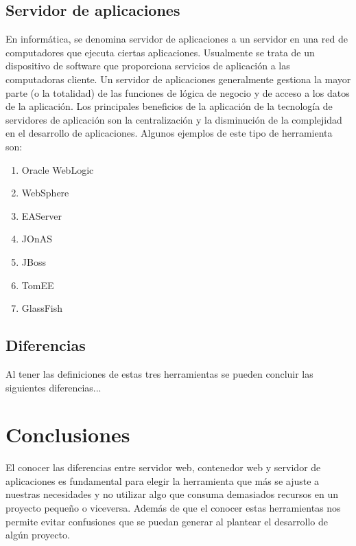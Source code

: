 \documentclass[a4paper,12pt]{article}
\begin{document}
\subsection{Servidor de aplicaciones}
En informática, se denomina servidor de aplicaciones a un servidor en una red de computadores que ejecuta ciertas aplicaciones. Usualmente se trata de un dispositivo de software que proporciona servicios de aplicación a las computadoras cliente. Un servidor de aplicaciones generalmente gestiona la mayor parte (o la totalidad) de las funciones de lógica de negocio y de acceso a los datos de la aplicación. Los principales beneficios de la aplicación de la tecnología de servidores de aplicación son la centralización y la disminución de la complejidad en el desarrollo de aplicaciones.
Algunos ejemplos de este tipo de herramienta son:
\begin{enumerate}
 \item Oracle WebLogic
 \item WebSphere
 \item EAServer
 \item JOnAS
 \item JBoss
 \item TomEE
 \item GlassFish
\end{enumerate}

\subsection{Diferencias}
Al tener las definiciones de estas tres herramientas se pueden concluir las siguientes diferencias...

\section{Conclusiones}
El conocer las diferencias entre servidor web, contenedor web y servidor de aplicaciones es fundamental para elegir la herramienta que más se ajuste a nuestras necesidades y no utilizar algo que consuma demasiados recursos en un proyecto pequeño o viceversa. Además de que el conocer estas herramientas nos permite evitar confusiones que se puedan generar al plantear el desarrollo de algún proyecto.



\end{document}
